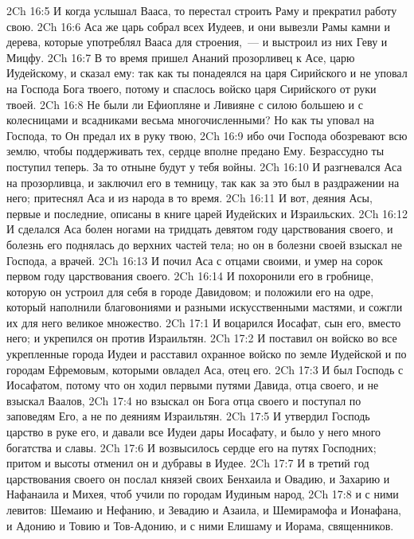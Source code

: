 \vs 2Ch 16:5 И когда услышал  Вааса, то перестал строить Раму и прекратил работу свою.
\vs 2Ch 16:6 Аса же царь собрал всех Иудеев, и они вывезли  Рамы камни и дерева, которые употреблял Вааса для строения,~--- и выстроил из них Геву и Мицфу.
\rsbpar\vs 2Ch 16:7 В то время пришел Ананий прозорливец к Асе, царю Иудейскому, и сказал ему: так как ты понадеялся на царя Сирийского и не уповал на Господа Бога твоего, потому и спаслось войско царя Сирийского от руки твоей.
\vs 2Ch 16:8 Не были ли Ефиопляне и Ливияне с силою большею и с колесницами и всадниками весьма многочисленными? Но как ты уповал на Господа, то Он предал их в руку твою,
\vs 2Ch 16:9 ибо очи Господа обозревают всю землю, чтобы поддерживать тех,  сердце вполне предано Ему. Безрассудно ты поступил теперь. За то отныне будут у тебя войны.
\vs 2Ch 16:10 И разгневался Аса на прозорливца, и заключил его в темницу, так как за это был в раздражении на него; притеснял Аса и  из народа в то время.
\rsbpar\vs 2Ch 16:11 И вот, деяния Асы, первые и последние, описаны в книге царей Иудейских и Израильских.
\vs 2Ch 16:12 И сделался Аса болен ногами на тридцать девятом году царствования своего, и болезнь его поднялась до верхних частей тела; но он в болезни своей взыскал не Господа, а врачей.
\vs 2Ch 16:13 И почил Аса с отцами своими, и умер на сорок первом году царствования своего.
\vs 2Ch 16:14 И похоронили его в гробнице, которую он устроил для себя в городе Давидовом; и положили его на одре, который наполнили благовониями и разными искусственными мастями, и сожгли их для него великое множество.
\vs 2Ch 17:1 И воцарился Иосафат, сын его, вместо него; и укрепился он против Израильтян.
\vs 2Ch 17:2 И поставил он войско во все укрепленные города Иудеи и расставил охранное войско по земле Иудейской и по городам Ефремовым, которыми овладел Аса, отец его.
\vs 2Ch 17:3 И был Господь с Иосафатом, потому что он ходил первыми путями Давида, отца своего, и не взыскал Ваалов,
\vs 2Ch 17:4 но взыскал он Бога отца своего и поступал по заповедям Его, а не по деяниям Израильтян.
\vs 2Ch 17:5 И утвердил Господь царство в руке его, и давали все Иудеи дары Иосафату, и было у него много богатства и славы.
\vs 2Ch 17:6 И возвысилось сердце его на путях Господних; притом и высоты отменил он и дубравы в Иудее.
\rsbpar\vs 2Ch 17:7 И в третий год царствования своего он послал князей своих Бенхаила и Овадию, и Захарию и Нафанаила и Михея, чтоб учили по городам Иудиным народ,
\vs 2Ch 17:8 и с ними левитов: Шемаию и Нефанию, и Зевадию и Азаила, и Шемирамофа и Ионафана, и Адонию и Товию и Тов-Адонию, и с ними Елишаму и Иорама, священников.
